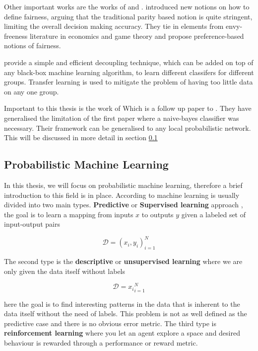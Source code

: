 {Other important works are the works of \cite{zafar2017} and \citet{dwork18}. \citet{zafar2017} introduced new notions on how to define fairness, arguing that the traditional parity based notion is  quite stringent, limiting the overall decision making accuracy. They tie in elements from envy-freeness literature in economics and game theory and propose preference-based notions of fairness. 

\citet{dwork18} provide a simple and efficient decoupling technique, which can be added on top of any black-box machine learning algorithm, to learn different classifers for different groups. Transfer learning is used to mitigate the problem of having too little data on any one group.

Important to this thesis is the work of \citet{choi2020} Which is a follow up paper to \cite{calders2010three}. They have generalised the limitation of the first paper where a naive-bayes classifier was necessary. Their framework can be generalised to any local probabilistic network. This will be discussed in more detail in section \ref{sec:probmac}

\subsection{Probabilistic Machine Learning}
\label{sec:probmac}

In this thesis, we will focus on probabilistic machine learning, therefore a brief introduction to this field is in place. According to \citet{murphy2012machine} machine learning is usually divided into two main types. \textbf{Predictive} or \textbf{Supervised learning} approach \cite[p.~2]{murphy2012machine}, the goal is to learn a mapping from inputs $x$ to outputs $y$ given a labeled set of input-output pairs

\begin{equation}
    \mathcal{D} = {(x_i, y_i)}_{i=1}^N
\end{equation}

The second type is the \textbf{descriptive} or \textbf{unsupervised learning} where we are only given the data itself without labels

\begin{equation}
    \mathcal{D} = {x_i}_{i=1}^N
\end{equation}

here the goal is to find interesting patterns in the data that is inherent to the data itself without the need of labels. This problem is not as well defined as the predictive case and there is no obvious error metric. The third type is \textbf{reinforcement learning} where you let an agent explore a space and desired behaviour is rewarded through a performance or reward metric. 

}
